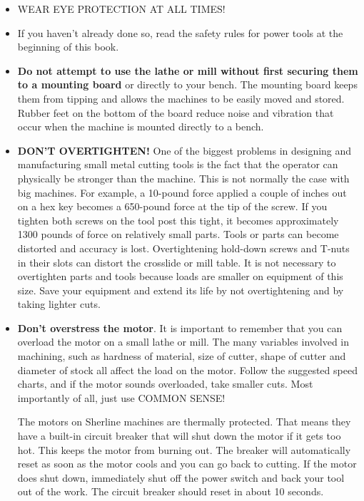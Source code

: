 \begin{itemize}
  \item WEAR EYE PROTECTION AT ALL TIMES!
  \item If you haven't already done so, read the safety rules for power tools at
  the beginning of this book.
  \item \textbf{Do not attempt to use the lathe or mill without first securing
  them to a mounting board} or directly to your bench. The mounting board keeps
  them from tipping and allows the machines to be easily moved and stored.
  Rubber feet on the bottom of the board reduce noise and vibration that occur
  when the machine is mounted directly to a bench.
  \item \textbf{DON'T OVERTIGHTEN!} One of the biggest problems in designing and
  manufacturing small metal cutting tools is the fact that the operator can
  physically be stronger than the machine. This is not normally the case with
  big machines. For example, a 10-pound force applied a couple of inches out on
  a hex key becomes a 650-pound force at the tip of the screw. If you tighten
  both screws on the tool post this tight, it becomes approximately 1300 pounds
  of force on relatively small parts. Tools or parts can become distorted and
  accuracy is lost. Overtightening hold-down screws and T-nuts in their slots
  can distort the crosslide or mill table. It is not necessary to overtighten
  parts and tools because loads are smaller on equipment of this size. Save your
  equipment and extend its life by not overtightening and by taking lighter
  cuts.
  \item \textbf{Don't overstress the motor}. It is important to remember that
  you can overload the motor on a small lathe or mill. The many variables
  involved in machining, such as hardness of material, size of cutter, shape of
  cutter and diameter of stock all affect the load on the motor. Follow the
  suggested speed charts, and if the motor sounds overloaded, take smaller cuts.
  Most importantly of all, just use COMMON SENSE!
  
  The motors on Sherline machines are thermally protected. That means they have
  a built-in circuit breaker that will shut down the motor if it gets too hot.
  This keeps the motor from burning out. The breaker will automatically reset
  as soon as the motor cools and you can go back to cutting. If the motor does
  shut down, immediately shut off the power switch and back your tool out of
  the work. The circuit breaker should reset in about 10 seconds.
  

\end{itemize}
